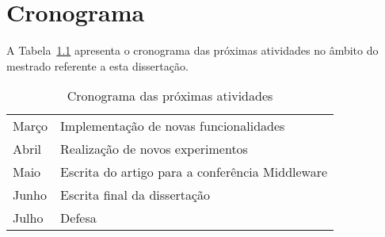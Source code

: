 \chapter{Cronograma}
\label{cap:cronograma}

A Tabela~\ref{tab:cronograma} apresenta o cronograma das próximas atividades no âmbito do mestrado referente a esta dissertação.

\begin{table}[!ht]
\begin{center}
    \begin{tabular}{l l}
	 \hline
Março & Implementação de novas funcionalidades \\
Abril & Realização de novos experimentos \\
Maio & Escrita do artigo para a conferência Middleware \\
Junho & Escrita final da dissertação \\
Julho & Defesa \\
	 \hline
    \end{tabular}
  \caption{Cronograma das próximas atividades}
  \label{tab:cronograma}
\end{center}
\end{table}
